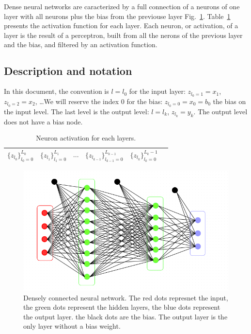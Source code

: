 \documentclass[final, paper=letter,5p,times,twocolumn]{elsarticle}
\begin{document}
Dense neural networks are caracterized by a full connection of a neurons of one layer with all neurons plus the bias from the previouse layer Fig.~\ref{fig:Densely_connected_neural_network}. Table~\ref{Layers_activations} presents the activation function for each layer. Each neuron, or activation, of a layer is the result of a perceptron, built from all the nerons of the previous layer and the bias, and filtered by an activation function. 

\subsection{Description and notation}

In this document, the convention is $l = l_{0}$ for the input layer: $z_{l_{0} = 1} = x_{1}$, $z_{l_{0} = 2} = x_{2}$, \dots We will reserve the index 0 for the bias: $z_{l_{0} = 0} = x_{0} = b_{0}$ the bias on the input level. The last level is the output level: $l = l_{k}$, $z_{l_{k}} = y_{k}$. The output level does not have a bias node.

\begin{table}[]
\centering
\caption{Neuron activation for each layers.}
\label{Layers_activations}
\begin{tabular}{llllll}
  \hline
 $\{ z_{l_{0}}\}_{l_{0} = 0}^{L_{0}}$&  $\{ z_{l_{1}}\}_{l_{1} = 0}^{L_{1}}$ &  $\cdots$ & $\{ z_{l_{k-1}}\}_{l_{k-1} = 0}^{L_{k-1}}$ &  $\{ z_{l_{k}}\}_{l_{k} = 0}^{L_{k}-1}$ &  \\ 
  \hline
\end{tabular}
\end{table}

\begin{figure}[htbp]
   \begin{center}
      \includegraphics[scale=0.3, angle=0]{images/densely_connected_nn.png}
   \end{center}
   \caption{Densely connected neural network. The red dots represnet the input, the green dots represent the hidden layers, the blue dots represent the output layer. the black dots are the bias. The output layer is the only layer without a bias weight.}
  \label{fig:Densely_connected_neural_network} 
\end{figure}
\end{document}
